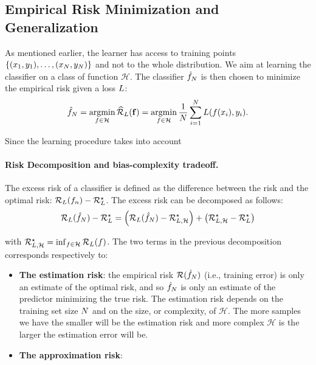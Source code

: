 \subsection{Empirical Risk Minimization and Generalization}

As mentioned earlier, the learner has access to training points  $\{(x_1,y_1),\dots,(x_N,y_N)\}$ and not to the whole distribution. We aim at learning the classifier on a class of function $\mathcal{H}$. The classifier $\hat{f}_N $ is then chosen to minimize the empirical risk given a loss $L$:
\begin{align*}
    \hat{f}_N = \operatorname*{argmin}_{f\in\mathcal{H}}\widehat{\mathcal{R}}_{L}(\mathbf{f})= \operatorname*{argmin}_{f\in\mathcal{H}}\frac{1}{N}\sum_{i=1}^N L(f(x_i),y_i).
\end{align*}

Since the learning procedure takes into account 


\paragraph*{Risk Decomposition and bias-complexity tradeoff.} The excess risk of a classifier is defined as the difference between the risk and the optimal risk: $\mathcal{R}_L(f_n) - \mathcal{R}_L^\star$. The excess risk can be decomposed as follows:
\begin{align*}
    \risk_\loss( \hat{f}_\numsamples) - \risk_\loss^\star = \left(\risk_\loss( \hat{f}_\numsamples) - \risk_{\loss,\mathcal{H}}^\star\right)+ \left(\risk_{\loss,\mathcal{H}}^\star - \risk_\loss^\star\right)
\end{align*}

with $\mathcal{R}_{L,\mathcal{H}}^\star = \inf_{f\in\mathcal{H}}\mathcal{R}_L(f)$. The two terms in the previous decomposition corresponds respectively to:
\begin{itemize}
    \item \textbf{The estimation risk}:  the empirical risk $\mathcal{R}(\hat{f}_N)$ (i.e., training error) is only an estimate of the optimal risk, and so $\hat{f}_N$   is only an estimate of the predictor minimizing the true risk. The estimation risk depends on the training set size $N$ and on the size, or complexity, of  $\mathcal{H}$.  The more samples we have the smaller will be the estimation risk and more complex $\mathcal{H}$ is the larger the estimation error will be.
    \item \textbf{The approximation risk}: 
\end{itemize}

